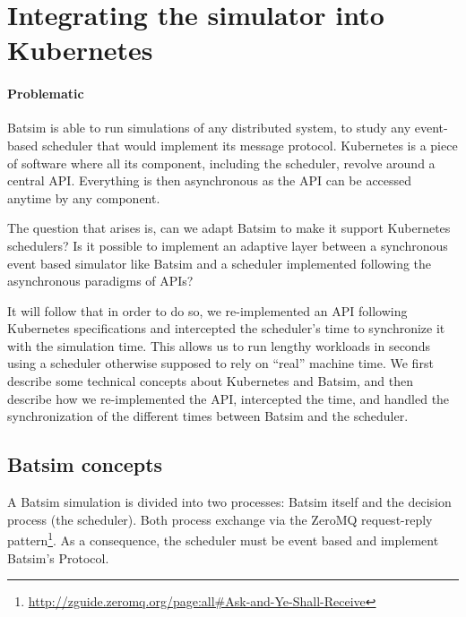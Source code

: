 \chapter{Integrating the simulator into Kubernetes}

\subsubsection{Problematic}

Batsim is able to run simulations of any distributed system, to study any
event-based scheduler that would implement its message protocol. Kubernetes is
a piece of software where all its component, including the scheduler, revolve
around a central API. Everything is then asynchronous as the API can be
accessed anytime by any component.

The question that arises is, can we adapt Batsim to make it support Kubernetes
schedulers? Is it possible to implement an adaptive layer between a synchronous
event based simulator like Batsim and a scheduler implemented following the
asynchronous paradigms of APIs?

It will follow that in order to do so, we re-implemented an API following
Kubernetes specifications and intercepted the scheduler's time to
synchronize it with the simulation time. This allows us to run lengthy
workloads in seconds using a scheduler otherwise supposed to rely on ``real''
machine time. We first describe some technical concepts about Kubernetes and
Batsim, and then describe how we re-implemented the API, intercepted the time,
and handled the synchronization of the different times between Batsim and the
scheduler.

\section{Batsim concepts}

A Batsim simulation is divided into two processes: Batsim itself and the
decision process (the scheduler). Both process exchange via the ZeroMQ
request-reply
pattern\footnote{\url{http://zguide.zeromq.org/page:all\#Ask-and-Ye-Shall-Receive}}.
As a consequence, the scheduler must be event based and implement Batsim's
Protocol.

